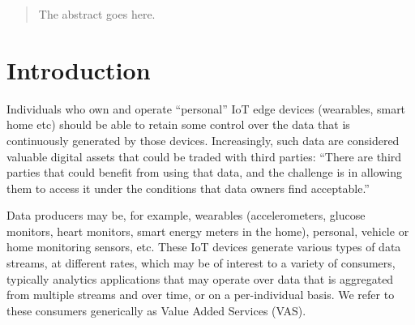 \documentclass[conference]{IEEEtran}
\begin{document}




\maketitle

\begin{abstract}
The abstract goes here.
\end{abstract}





%
\IEEEpeerreviewmaketitle



\section{Introduction}

Individuals who own and operate “personal” IoT edge devices (wearables, smart home etc) should be able to retain some control over the data that is continuously generated by those devices.
Increasingly, such data are considered valuable digital assets that could be traded with third parties:  “There are third parties that could benefit from using that data, and the challenge is in allowing them to access it under the conditions that data owners find acceptable.” 

Data producers may be, for example, wearables (accelerometers, glucose monitors, heart monitors, smart energy meters in the home), personal, vehicle or home monitoring sensors, etc.
These IoT devices generate various types of data streams, at different rates, which may be of interest to a variety of consumers, typically analytics applications that may operate over data that is aggregated from multiple streams and over time, or on a per-individual basis.
We refer to these consumers generically as Value Added Services (VAS).
\end{document}
